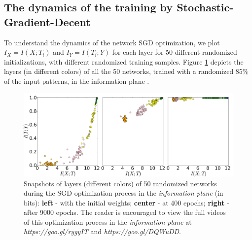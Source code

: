 \documentclass[11pt]{article}
\newcommand{\ignore}[1]{}
\begin{document}
\ignore{
Let be $x\in X$ and $y\in Y$ two random variable with a joint distribution
$p\left(x,y\right)$, and a DNN with $N$ layers. As previously explained,
we can look on each of the layers $1\le i\le N$ in the network as
random variable $T_{i}$. Therefore, the mutual information between
the output of each layer and $X$ and the output of each layer and
$Y$ - $I\left(X;T_{i}\right)$ and $I\left(T_{i};Y\right)$ respectively
can be calculated by - 
\begin{align}
I_{Y}^{i}=I(Y;T_{i}) & =\sum_{y\in Y,t\in T_{i}}p\left(y,t\right)\log\left(\frac{p\left(y,t\right)}{p\left(y\right)p\left(t\right)}\right)\\
 & =\sum_{y\in Y,t\in T_{i}}p\left(y|t\right)p\left(t\right)\log\left(\frac{p\left(y|t\right)}{p\left(y\right)}\right)
\end{align}

and 

\begin{align}
I_{X}^{i}=I(X;T_{i}) & =\sum_{x\in X,t\in T_{i}}p\left(x,t\right)\log\left(\frac{p\left(x,t\right)}{p\left(x\right)p\left(t\right)}\right)\\
 & =\sum_{x\in X,t\in T_{i}}p\left(x|t\right)p\left(t\right)\log\left(\frac{p\left(x|t\right)}{p\left(x\right)}\right)
\end{align}
}

\subsection{The dynamics of the training by Stochastic-Gradient-Decent}

To understand the dynamics of the network SGD optimization, we plot 
$I_X=I(X;T_i)$ and $I_Y= I(T_i;Y)$  for each layer for 50 different randomized initializations, with different randomized training samples. 
Figure \ref{opt_process} depicts the layers (in different colors) of all the 50 networks, trained with a randomized 85\% of the input patterns, in the information plane . 

\begin{figure}[ht]
\centerline{\includegraphics[width=\textwidth]{3_time_series_old.png}}
\caption{Snapshots of layers (different colors) of 50 randomized networks during the SGD optimization process in the \textit{information plane} (in bits):  \textbf{left} - with the initial weights;  \textbf{center} -  at 400 epochs; \textbf{right} -  after 9000 epochs.   The reader is encouraged to view the full videos of this optimization process in the \textit{information plane} at \textit{https://goo.gl/rygyIT} and \textit{https://goo.gl/DQWuDD}.}
\label{opt_process}
\vskip 0.1in
\end{figure}
\end{document}

